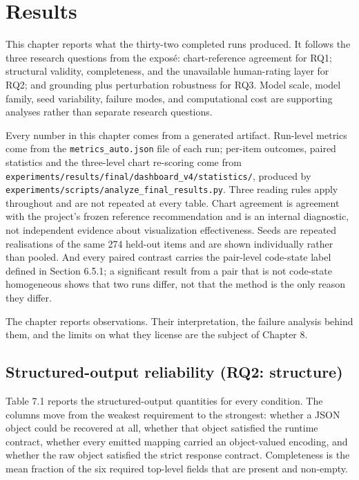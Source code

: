 \chapter{Results}

This chapter reports what the thirty-two completed runs produced. It follows the three research questions from the exposé: chart-reference agreement for RQ1; structural validity, completeness, and the unavailable human-rating layer for RQ2; and grounding plus perturbation robustness for RQ3. Model scale, model family, seed variability, failure modes, and computational cost are supporting analyses rather than separate research questions.

Every number in this chapter comes from a generated artifact. Run-level metrics come from the \texttt{metrics\_auto.json} file of each run; per-item outcomes, paired statistics and the three-level chart re-scoring come from \nolinkurl{experiments/results/final/dashboard_v4/statistics/}, produced by \nolinkurl{experiments/scripts/analyze_final_results.py}. Three reading rules apply throughout and are not repeated at every table. Chart agreement is agreement with the project's frozen reference recommendation and is an internal diagnostic, not independent evidence about visualization effectiveness. Seeds are repeated realisations of the same 274 held-out items and are shown individually rather than pooled. And every paired contrast carries the pair-level code-state label defined in Section 6.5.1; a significant result from a pair that is not code-state homogeneous shows that two runs differ, not that the method is the only reason they differ.

The chapter reports observations. Their interpretation, the failure analysis behind them, and the limits on what they license are the subject of Chapter 8.

\section{Structured-output reliability (RQ2: structure)}

Table 7.1 reports the structured-output quantities for every condition. The columns move from the weakest requirement to the strongest: whether a JSON object could be recovered at all, whether that object satisfied the runtime contract, whether every emitted mapping carried an object-valued encoding, and whether the raw object satisfied the strict response contract. Completeness is the mean fraction of the six required top-level fields that are present and non-empty.


